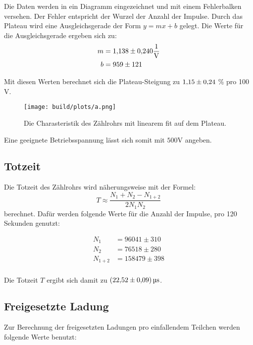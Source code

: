 \noindent Die Daten werden in ein Diagramm eingezeichnet und mit einem Fehlerbalken versehen. Der Fehler entspricht der Wurzel der Anzahl der Impulse.
Durch das Plateau wird eine Ausgleichsgerade der Form $y = mx + b$ gelegt. Die Werte für die Ausgleichsgerade ergeben sich zu:
\begin{align}
    m&= \num{1.138 \pm 0.24} \si{\per\volt} \nonumber \\
    b&= \num{959 \pm 121}    \nonumber
\end{align}

\noindent Mit diesen Werten berechnet sich die Plateau-Steigung zu $\num{1.15 \pm 0.24}$ \% pro 100 $\si{\volt}$.

\begin{figure}[H]
    \centering
    \texttt{[image: build/plots/a.png]}
    \caption{Die Charasteristik des Zählrohrs mit linearem fit auf dem Plateau.}
    \label{img:plot1}
\end{figure}
\noindent
Eine geeignete Betriebsspannung lässt sich somit mit \approx$500\si{\volt}$ angeben.

\subsection{Totzeit}

\noindent Die Totzeit des Zählrohrs wird näherungsweise mit der Formel:
\begin{equation}
    T \approx \frac{N_1 + N_2 - N_{1+2}}{2N_1N_2} \nonumber
\end{equation}
\noindent berechnet. Dafür werden folgende Werte für die Anzahl der Impulse, pro 120 Sekunden genutzt:

\begin{align*} 
    N_1 &= 96041 \pm 310\\
    N_2 &= 76518 \pm 280\\
    N_{1+2} &= 158479 \pm 398\\
\end{align*}

\noindent Die Totzeit $T$ ergibt sich damit zu $\SI{22.52 +- 0.09}{\micro\second}$.

\subsection{Freigesetzte Ladung}

\noindent Zur Berechnung der freigesetzten Ladungen pro einfallendem Teilchen werden folgende Werte benutzt:

